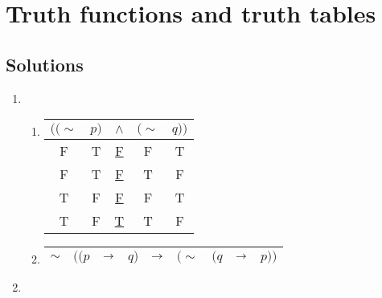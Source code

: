 \section{Truth functions and truth tables}

\subsection*{Solutions}

\begin{enumerate}
  \item %
    \begin{enumerate}[(\alph*)]
      \item 
        \begin{tabular}{ccccc}
          \(((\sim\)&
          \(p)\)&
          \(\wedge\)&
          \((\sim\)&
          \(q))\)\\\hline

          F&
          T&
          \underline{F}&
          F&
          T\\

          F&
          T&
          \underline{F}&
          T&
          F\\

          T&
          F&
          \underline{F}&
          F&
          T\\

          T&
          F&
          \underline{T}&
          T&
          F
        \end{tabular}

        \item
          \begin{tabular}{ccccccccc}
            \(\sim\)&
            \(((p\)&
            \(\rightarrow\)&
            \(q)\)&
            \(\rightarrow\)&
            \((\sim\)&
            \((q\)&
            \(\rightarrow\)&
            \(p))\)\\\hline
          \end{tabular}
    \end{enumerate}

  \item %
\end{enumerate}
